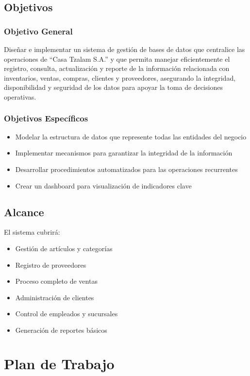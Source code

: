 \documentclass[a4paper, 12pt]{article}
\begin{document}
\subsection{Objetivos}
\subsubsection{Objetivo General}
Diseñar e implementar un sistema de gestión de bases de datos que centralice las operaciones de ``Casa Tzalam S.A.'' y que permita manejar eficientemente el registro, consulta, actualización y reporte de la información relacionada con inventarios, ventas, compras, clientes y proveedores, asegurando la integridad, disponibilidad y seguridad de los datos para apoyar la toma de decisiones operativas.

\subsubsection{Objetivos Específicos}
\begin{itemize}
    \item Modelar la estructura de datos que represente todas las entidades del negocio
    \item Implementar mecanismos para garantizar la integridad de la información
    \item Desarrollar procedimientos automatizados para las operaciones recurrentes
    \item Crear un dashboard para visualización de indicadores clave
\end{itemize}

\subsection{Alcance}
El sistema cubrirá:
\begin{itemize}
    \item Gestión de artículos y categorías
    \item Registro de proveedores
    \item Proceso completo de ventas
    \item Administración de clientes
    \item Control de empleados y sucursales
    \item Generación de reportes básicos
\end{itemize}

\section{Plan de Trabajo}
\end{document}
